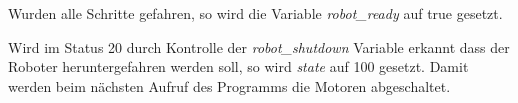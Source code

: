 Wurden alle Schritte gefahren, so wird die Variable \textit{robot\_ready} auf true gesetzt. 

Wird im Status 20 durch Kontrolle der \textit{robot\_shutdown} Variable erkannt dass der Roboter heruntergefahren werden soll, so wird \textit{state} auf 100 gesetzt. Damit werden beim nächsten Aufruf des Programms die  Motoren abgeschaltet.


